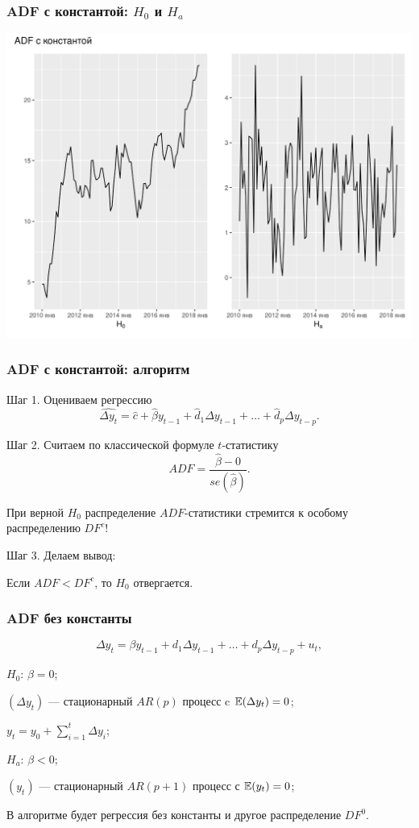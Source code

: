 \begin{frame}
  \frametitle{ADF с константой: $H_0$ и $H_a$}
  \includegraphics[width=\textwidth]{pictures/om_ts_06-046.png}

\end{frame}

\begin{frame}
  \frametitle{ADF с константой: алгоритм}

  Шаг 1. Оцениваем \alert{регрессию}
  \[
    \widehat{\Delta y_t} = \hat c + \hat \beta y_{t-1} + \hat d_1 \Delta y_{t-1} + \ldots + \hat d_p \Delta y_{t-p}.  
  \]

  \pause
  Шаг 2. Считаем по \alert{классической формуле} $t$-статистику
  \[
  ADF = \frac{\hat \beta -  0}{se(\hat \beta)}.  
  \]

  \pause
  При верной $H_0$ распределение $ADF$-статистики стремится к \alert{особому распределению} $DF^c$!

  \pause 
  Шаг 3. Делаем вывод:
  
  Если $ADF < DF^c$, то $H_0$ отвергается. 

\end{frame}


\begin{frame}
  \frametitle{ADF без константы}
  \[
  \Delta y_t = \beta y_{t-1} + d_1 \Delta y_{t-1} + \ldots + d_p \Delta y_{t-p} + u_t,  
  \]

  \pause

  \alert{$H_0$: $\beta = 0$};
  
  $(\Delta y_t)$ — стационарный $AR(p)$ процесс c $\mathbb{E}(\Delta y_t) = 0$;

  $y_t = y_0 + \sum_{i=1}^t \Delta y_i $;

  \pause

  \alert{$H_a$: $\beta < 0$};

  $(y_t)$ — стационарный $AR(p + 1)$ процесс с $\mathbb{E}(y_t) = 0$;

  \pause 

  В алгоритме будет \alert{регрессия без константы} и другое распределение $DF^0$.

\end{frame}



